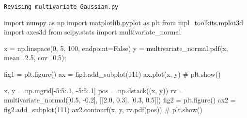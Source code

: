 \documentclass[
  letterpaper,
  DIV=11,
  numbers=noendperiod]{scrreprt}
\newenvironment{Shaded}{\begin{snugshade}}{\end{snugshade}}
\newcommand{\CommentTok}[1]{\textcolor[rgb]{0.37,0.37,0.37}{#1}}
\newcommand{\DecValTok}[1]{\textcolor[rgb]{0.68,0.00,0.00}{#1}}
\newcommand{\FloatTok}[1]{\textcolor[rgb]{0.68,0.00,0.00}{#1}}
\newcommand{\ImportTok}[1]{\textcolor[rgb]{0.00,0.46,0.62}{#1}}
\newcommand{\NormalTok}[1]{\textcolor[rgb]{0.00,0.23,0.31}{#1}}
\newcommand{\OperatorTok}[1]{\textcolor[rgb]{0.37,0.37,0.37}{#1}}
\newcommand{\VariableTok}[1]{\textcolor[rgb]{0.07,0.07,0.07}{#1}}
\begin{document}
\begin{codelisting}

\caption{\texttt{Revising multivariate Gaussian.py}}

\begin{Shaded}
\begin{Highlighting}[]
\ImportTok{import}\NormalTok{ numpy }\ImportTok{as}\NormalTok{ np}
\ImportTok{import}\NormalTok{ matplotlib.pyplot }\ImportTok{as}\NormalTok{ plt}
\ImportTok{from}\NormalTok{ mpl\_toolkits.mplot3d }\ImportTok{import}\NormalTok{ axes3d}
\ImportTok{from}\NormalTok{ scipy.stats }\ImportTok{import}\NormalTok{ multivariate\_normal}

\NormalTok{x }\OperatorTok{=}\NormalTok{ np.linspace(}\DecValTok{0}\NormalTok{, }\DecValTok{5}\NormalTok{, }\DecValTok{100}\NormalTok{, endpoint}\OperatorTok{=}\VariableTok{False}\NormalTok{)}
\NormalTok{y }\OperatorTok{=}\NormalTok{ multivariate\_normal.pdf(x, mean}\OperatorTok{=}\FloatTok{2.5}\NormalTok{, cov}\OperatorTok{=}\FloatTok{0.5}\NormalTok{)}\OperatorTok{;}

\NormalTok{fig1 }\OperatorTok{=}\NormalTok{ plt.figure()}
\NormalTok{ax }\OperatorTok{=}\NormalTok{ fig1.add\_subplot(}\DecValTok{111}\NormalTok{)}
\NormalTok{ax.plot(x, y)}
\CommentTok{\# plt.show()}

\NormalTok{x, y }\OperatorTok{=}\NormalTok{ np.mgrid[}\OperatorTok{{-}}\DecValTok{5}\NormalTok{:}\DecValTok{5}\NormalTok{:}\FloatTok{.1}\NormalTok{, }\OperatorTok{{-}}\DecValTok{5}\NormalTok{:}\DecValTok{5}\NormalTok{:}\FloatTok{.1}\NormalTok{]}
\NormalTok{pos }\OperatorTok{=}\NormalTok{ np.dstack((x, y))}
\NormalTok{rv }\OperatorTok{=}\NormalTok{ multivariate\_normal([}\FloatTok{0.5}\NormalTok{, }\OperatorTok{{-}}\FloatTok{0.2}\NormalTok{], [[}\FloatTok{2.0}\NormalTok{, }\FloatTok{0.3}\NormalTok{], [}\FloatTok{0.3}\NormalTok{, }\FloatTok{0.5}\NormalTok{]])}
\NormalTok{fig2 }\OperatorTok{=}\NormalTok{ plt.figure()}
\NormalTok{ax2 }\OperatorTok{=}\NormalTok{ fig2.add\_subplot(}\DecValTok{111}\NormalTok{)}
\NormalTok{ax2.contourf(x, y, rv.pdf(pos))}
\CommentTok{\# plt.show()}


\end{Highlighting}
\end{Shaded}
\end{codelisting}
\end{document}

